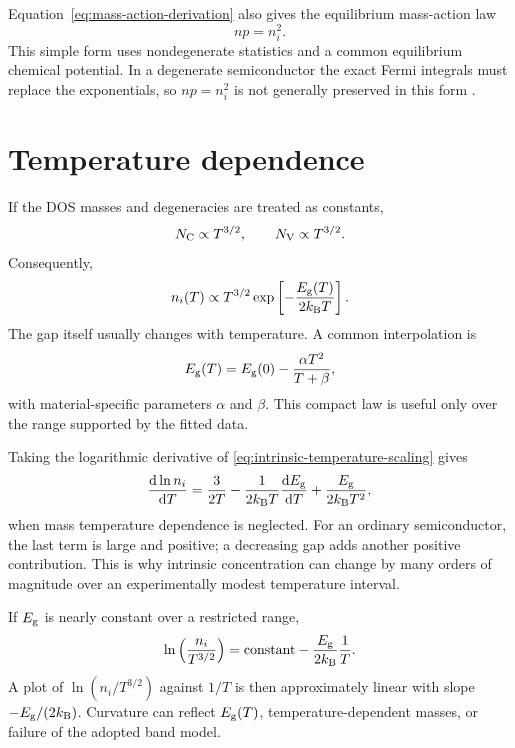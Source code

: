 Equation~\eqref{eq:mass-action-derivation} also gives the equilibrium mass-action
law
\begin{equation}
  np=n_i^2.
  \label{eq:mass-action-law}
\end{equation}
This simple form uses nondegenerate statistics and a common equilibrium chemical
potential.  In a degenerate semiconductor the exact Fermi integrals must replace
the exponentials, so $np=n_i^2$ is not generally preserved in this form
\cite[Sec.~1.4.1]{szeNg2007}.

\section{Temperature dependence}

If the DOS masses and degeneracies are treated as constants,
\begin{equation}
  N_{\mathrm C}\propto T^{3/2},
  \qquad
  N_{\mathrm V}\propto T^{3/2}.
  \label{eq:effective-density-temperature-scaling}
\end{equation}
Consequently,
\begin{equation}
  n_i(T)
  \propto T^{3/2}
  \exp\left[-\frac{E_{\mathrm g}(T)}{2k_{\mathrm B} T}\right].
  \label{eq:intrinsic-temperature-scaling}
\end{equation}
The gap itself usually changes with temperature.  A common interpolation is
\begin{equation}
  E_{\mathrm g}(T)
  =E_{\mathrm g}(0)-\frac{\alpha T^2}{T+\beta},
  \label{eq:varshni-gap}
\end{equation}
with material-specific parameters $\alpha$ and $\beta$.  This compact law is
useful only over the range supported by the fitted data.

Taking the logarithmic derivative of
\cref{eq:intrinsic-temperature-scaling} gives
\begin{equation}
  \frac{\mathop{}\!\mathrm{d}\ln n_i}{\mathop{}\!\mathrm{d} T}
  =\frac{3}{2T}
   -\frac{1}{2k_{\mathrm B} T}\frac{\mathop{}\!\mathrm{d}E_{\mathrm g}}{\mathop{}\!\mathrm{d} T}
   +\frac{E_{\mathrm g}}{2k_{\mathrm B} T^2},
  \label{eq:intrinsic-log-temperature-derivative}
\end{equation}
when mass temperature dependence is neglected.  For an ordinary semiconductor,
the last term is large and positive; a decreasing gap adds another positive
contribution.  This is why intrinsic concentration can change by many orders of
magnitude over an experimentally modest temperature interval.

If $E_{\mathrm g}$ is nearly constant over a restricted range,
\begin{equation}
  \ln\left(\frac{n_i}{T^{3/2}}\right)
  =\text{constant}-\frac{E_{\mathrm g}}{2k_{\mathrm B}}\frac{1}{T}.
  \label{eq:intrinsic-arrhenius-linearization}
\end{equation}
A plot of $\ln(n_i/T^{3/2})$ against $1/T$ is then approximately linear with
slope $-E_{\mathrm g}/(2k_{\mathrm B})$.  Curvature can reflect $E_{\mathrm g}(T)$, temperature-dependent
masses, or failure of the adopted band model.

